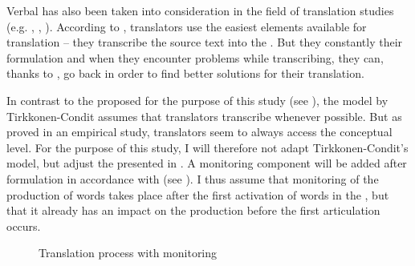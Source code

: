 \documentclass[output=paper]{LSP/langsci}
\begin{document}
Verbal  has also been taken into consideration in the field of translation studies (e.g. \citealt{Carl2012Inside}, \citealt{TirkkonenCondit2005}, \citealt{Toury1995}). According to \citet{TirkkonenCondit2005}, translators use the easiest elements available for translation -- they transcribe the source text into the . But they constantly  their formulation and when they encounter problems while transcribing, they can, thanks to , go back in order to find better solutions for their translation. 

In contrast to the  proposed for the purpose of this study (see ), the model by Tirkkonen-Condit assumes that translators transcribe whenever possible. But as \citet{Francis2005} proved in an empirical study, translators seem to always access the conceptual level. For the purpose of this study, I will therefore not adapt Tirkkonen-Condit's model, but adjust the  presented in . A monitoring component will be added after formulation in accordance with \citet{Levelt1999} (see ). I thus assume that monitoring of the production of words takes place after the first activation of words in the , but that it already has an impact on the production before the first articulation occurs. 

\begin{figure}
 	\caption{Translation process with monitoring}
 	\label{oster:fig:3}
\end{figure}
\end{document}
